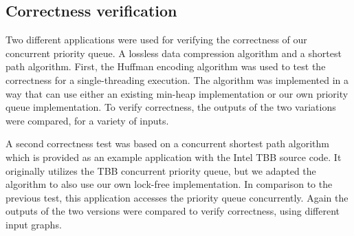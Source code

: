 

\subsection{Correctness verification}
\label{subsec:corr_ver}
Two different applications were used for verifying the correctness of our concurrent priority queue.
A lossless data compression algorithm and a shortest path algorithm. 
First, the Huffman encoding algorithm was used to test the correctness for a single-threading execution. The algorithm was implemented in a way that can use either an existing min-heap implementation or our own priority queue implementation.
To verify correctness, the outputs of the two variations were compared, for a variety of inputs.

A second correctness test was based on a concurrent shortest path algorithm which is provided as an example application with the Intel TBB source code.
It originally utilizes the TBB concurrent priority queue, but we adapted the algorithm to also use our own lock-free implementation.
In comparison to the previous test, this application accesses the priority queue concurrently.
Again the outputs of the two versions were compared to verify correctness, using different input graphs.

